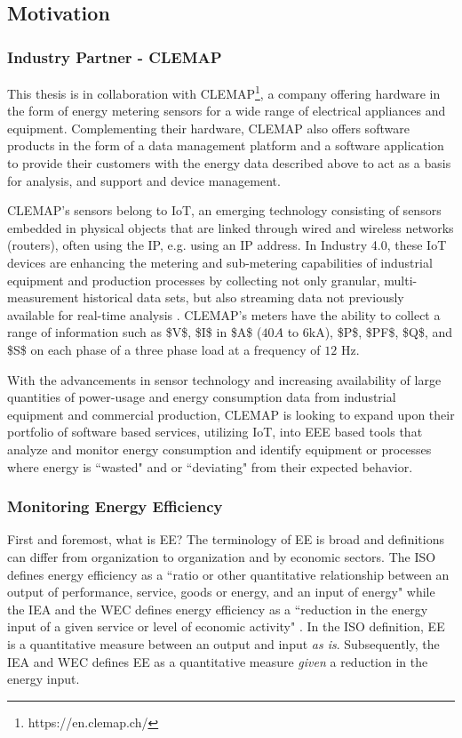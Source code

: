 \subsection{Motivation}

\subsubsection{Industry Partner - CLEMAP}
This thesis is in collaboration with \ac{CLEMAP}\footnote[1]{https://en.clemap.ch/}, a company offering hardware in the form of energy metering sensors for a wide range of electrical appliances and equipment. Complementing their hardware, CLEMAP also offers software products in the form of a data management platform and a software application to provide their customers with the energy data described above to act as a basis for analysis, and support and device management.

CLEMAP’s sensors belong to \ac{IoT}, an emerging technology consisting of sensors embedded in physical objects that are linked through wired and wireless networks (routers), often using the \ac{IP}, e.g. using an IP address. In Industry 4.0, these IoT devices are enhancing the metering and sub-metering capabilities of industrial equipment and production processes by collecting not only granular, multi-measurement historical data sets, but also streaming data not previously available for real-time analysis \cite{iot-1}. CLEMAP's meters have the ability to collect a range of information such as \ac{$V$}, \ac{$I$} in \ac{$A$} ($40A$ to $6$kA), \ac{$P$}, \ac{$PF$}, \ac{$Q$}, and \ac{$S$} on each phase of a three phase load at a frequency of $12$ \ac{Hz}. 

With the advancements in sensor technology and increasing availability of large quantities of power-usage and energy consumption data from industrial equipment and commercial production, CLEMAP is looking to expand upon their portfolio of software based services, utilizing IoT, into \ac{EEE} based tools that analyze and monitor energy consumption and identify equipment or processes where energy is ``wasted" and or ``deviating" from their expected behavior.

\subsubsection{Monitoring Energy Efficiency}

First and foremost, what is \ac{EE}? The terminology of EE is broad and definitions can differ from organization to organization and by economic sectors. The \ac{ISO} defines energy efficiency as a ``ratio or other quantitative relationship between an output of performance, service, goods or energy, and an input of energy" \cite{ISO} while the \ac{IEA} and the \ac{WEC} defines energy efficiency as a ``reduction in the energy input of a given service or level of economic activity" \cite{iea-wec}. In the ISO definition, EE is a quantitative measure between an output and input \textit{as is}. Subsequently, the IEA and WEC defines EE as a quantitative measure \textit{given} a reduction in the energy input.

